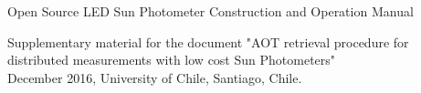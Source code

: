 \documentclass[12pt,letterpaper]{article}
\numberwithin{figure}{section}
\numberwithin{equation}{section}
\numberwithin{table}{section}
\begin{document}
\newpage

\pagestyle{fancy}
\fancyhf{}
\renewcommand{\headrulewidth}{0pt}

\vspace*{6cm}
\begin{center}

{


\huge Open Source LED Sun Photometer Construction and Operation Manual\\
\vspace{0.5cm}

}


\vspace{11cm}

{
{
Supplementary material for the document "AOT retrieval procedure for distributed measurements with low cost Sun Photometers"\\ December 2016, University of Chile, Santiago, Chile.
}
}
\end{center}


\newpage
\marginsize{3cm}{3cm}{-1cm}{2cm} 
\pagestyle{fancy}
\fancyhf{}

\end{document}
